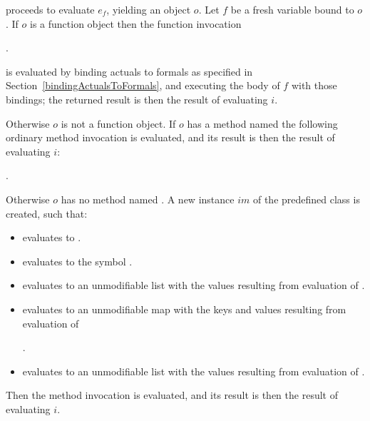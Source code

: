 \documentclass[makeidx]{article}
\begin{document}
\noindent
proceeds to evaluate $e_f$, yielding an object $o$.
Let $f$ be a fresh variable bound to $o$.
If $o$ is a function object then the function invocation

.

is evaluated by binding actuals to formals as specified in Section~\ref{bindingActualsToFormals},
and executing the body of $f$ with those bindings;
the returned result is then the result of evaluating $i$.

\LMHash{}%
Otherwise $o$ is not a function object.
If $o$ has a method named \CALL{}
the following ordinary method invocation is evaluated,
and its result is then the result of evaluating $i$:

.

\LMHash{}%
Otherwise $o$ has no method named \CALL{}.
A new instance $im$ of the predefined class  is created, such that:
\begin{itemize}
\item {} evaluates to \code{\TRUE{}}.
\item {} evaluates to the symbol .
\item {} evaluates to an unmodifiable list with the values
resulting from evaluation of
.
\item {} evaluates to an unmodifiable map
with the keys and values resulting from evaluation of

.
\item {} evaluates to an unmodifiable list
with the values resulting from evaluation of
.
\end{itemize}

\LMHash{}%
Then the method invocation  is evaluated,
and its result is then the result of evaluating $i$.

\end{document}
